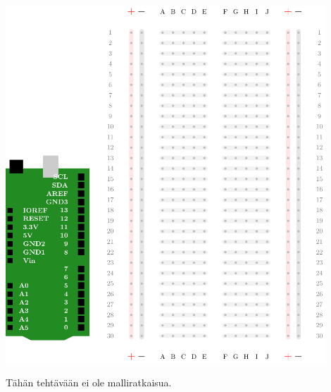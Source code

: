 \includegraphics[width=0.9\textwidth]{kuvat/kuva11.pdf}

\begin{tcolorbox}[colback=yellow!10, title={Koodaa!},colbacktitle=orange,breakable]
\begin{solution}
\vspace{18cm}
Tähän tehtävään ei ole malliratkaisua.
\end{solution}
\end{tcolorbox}